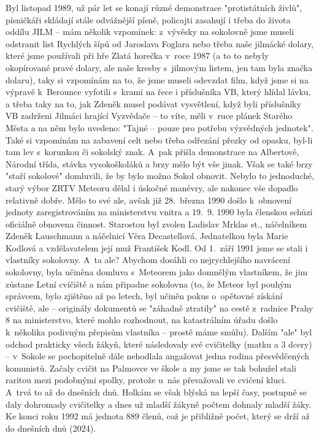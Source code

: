 \documentclass[a5paper, 11pt, twoside]{article}
\begin{document}
\noindent
Byl listopad 1989, už pár let se konají různé demonstrace "protistátních
živlů", písničkáři skládají stále odvážnější písně, policajti zasahují
i třeba do života oddílu JILM -- mám několik vzpomínek: z~vývěsky na
sokolovně jsme museli odstranit list Rychlých šípů od Jaroslava Foglara
nebo třeba naše jilmácké dolary, které jsme používali při hře Zlatá
horečka v~roce 1987 (a to to nebyly okopírované pravé dolary, ale naše
kresby s~jilmovým listem, jen tam byla značka dolaru), taky si vzpomínám
na to, že jsme museli odevzdat film, když jsme si na výpravě k~Berounce
vyfotili s~krami na řece i příslušníka VB, který hlídal lávku, a třeba
taky na to, jak Zdeněk musel podávat vysvětlení, když byli příslušníky
VB zadrženi Jilmáci hrající Vyzvědače -- to víte, měli v~ruce plánek
Starého Města a na něm bylo uvedeno: "Tajné -- pouze pro potřebu
výzvědných jednotek". Také si vzpomínám na zabavení celt nebo třeba
odřezání přezky od opasku, byl-li tam lev s~korunkou či sokolský znak.
A~pak přišla demonstrace na Albertově, Národní třída, stávka vysokoškoláků
a brzy mělo být vše jinak. Však se také brzy "staří sokolové"
domluvili, že by bylo možno Sokol obnovit. Nebylo to jednoduché, starý
výbor ZRTV Meteoru dělal i úskočné manévry, ale nakonec vše dopadlo
relativně dobře. Mělo to své ale, avšak již 28.~března 1990 došlo
k~obnovení jednoty zaregistrováním na ministerstvu vnitra a 19.~9. 1990
byla členskou schůzí oficiálně obnovena činnost. Starostou byl zvolen
Ladislav Mrklas st., náčelníkem Zdeněk Lauschmann a náčelnicí Věra
Decastellová. Jednatelkou byla Marie Kodlová a vzdělavatelem její muž
František Kodl. Od 1.~září 1991 jsme se stali i vlastníky sokolovny.
A~ta ale? Abychom dosáhli co nejrychlejšího navrácení sokolovny, byla
učiněna domluva s~Meteorem jako domnělým vlastníkem, že jim zůstane
Letní cvičiště a nám připadne sokolovna (to, že Meteor byl pouhým
správcem, bylo zjištěno až po letech, byl učiněn pokus o~opětovné
získání cvičiště, ale -- originály dokumentů se "záhadně ztratily" na
cestě z~radnice Prahy 8 na ministerstvo, které mohlo rozhodnout, na
katastrálním úřadu došlo k~několika podivným přepisům vlastníka --
prostě máme smůlu). Dalším "ale" byl odchod prakticky všech žákyň,
které následovaly své cvičitelky (matku a 3 dcery) -- v~Sokole se
pochopitelně dále nehodlala angažovat jedna rodina přesvědčených
komunistů. Začaly cvičit na Palmovce ve škole a my jsme se tak bohužel
stali raritou mezi podobnými spolky, protože u~nás převažovali ve
cvičení kluci. A~trvá to až do dnešních dnů. Holkám se však blýská na
lepší časy, postupně se daly dohromady cvičitelky a dnes už mladší
žákyně počtem dohnaly mladší žáky. Ke konci roku 1992 má jednota 889
členů, což je přibližně počet, který se drží až do dnešních dnů (2024).
\end{document}
